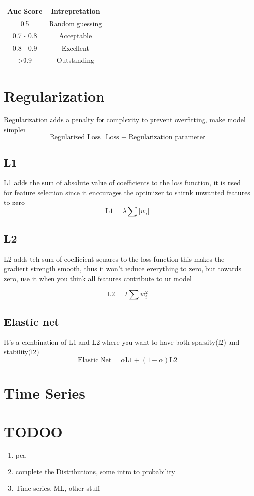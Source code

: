 \documentclass[12pt]{extarticle}
\begin{document}
\begin{table}[H]
    \centering
    \begin{tabular}{|c|c|}
        \hline
        Auc Score & Intrepretation \\
        \hline
         0.5 &  Random guessing \\
         0.7 - 0.8 & Acceptable \\
         0.8 - 0.9 & Excellent \\
         \textgreater 0.9 & Outstanding\\
         \hline     
    \end{tabular}
\end{table}

\section{Regularization}
Regularization adds a penalty for complexity to prevent overfitting, make model simpler
$$\text{Regularized Loss} = \text{Loss + Regularization parameter}$$

\subsection{L1}
L1 adds the sum of absolute value of coefficients to the loss function, 
it is used for feature selection since it encourages the optimizer to shirnk
unwanted features to zero
$$\text{L1} = \lambda \sum|w_i| $$

\subsection{L2}
L2 adds teh sum of coefficient squares to the loss function this 
makes the gradient strength smooth, thus it won't reduce everything 
to zero, but towards zero, use it when you think all features contribute
to ur model

$$ \text{L2} = \lambda \sum w_i^2 $$

\subsection{Elastic net}
It's a combination of L1 and L2 where you want to have both sparsity(l2) 
and stability(l2)
$$ \text{Elastic Net} = \alpha \text{L1} + (1-\alpha)\text{L2} $$


\section{Time Series}


\section{TODOO}
\begin{enumerate}
    \item pca
    \item complete the Distributions, some intro to probability
    \item Time series, ML, other stuff

\end{enumerate}
\end{document}
